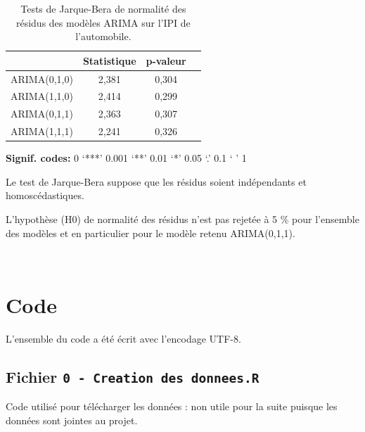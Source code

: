 \documentclass[french]{article}
\begin{document}
\begin{table}[!h]

\caption{\label{tab:tabjb}Tests de Jarque-Bera de normalité des résidus des modèles ARIMA sur l'IPI de l'automobile.}
\centering
\begin{threeparttable}
\begin{tabular}[t]{lccc}
\toprule
  & Statistique & p-valeur & \\
\midrule
ARIMA(0,1,0) & 2,381 & 0,304 & \\
ARIMA(1,1,0) & 2,414 & 0,299 & \\
ARIMA(0,1,1) & 2,363 & 0,307 & \\
ARIMA(1,1,1) & 2,241 & 0,326 & \\
\bottomrule
\end{tabular}
\begin{tablenotes}
\item \hspace{-0.4cm}\textbf{Signif. codes: }0 `***' 0.001 `**' 0.01 `*' 0.05 `.' 0.1 ` ' 1
\item Le test de Jarque-Bera suppose que les résidus soient indépendants et homoscédastiques.
\item L’hypothèse (H0) de normalité des résidus n’est pas rejetée à 5 \% pour l’ensemble des modèles et en particulier pour le modèle retenu ARIMA(0,1,1).
\end{tablenotes}
\end{threeparttable}
\end{table}

\newpage

~
\newpage

\hypertarget{code}{%
\section{\texorpdfstring{Code \faRProject{}}{Code }}\label{code}}

L'ensemble du code a été écrit avec l'encodage UTF-8.

\hypertarget{fichier-0---creation-des-donnees.r}{%
\subsection{\texorpdfstring{Fichier \texttt{0\ -\ Creation\ des\ donnees.R}}{Fichier 0 - Creation des donnees.R}}\label{fichier-0---creation-des-donnees.r}}

Code utilisé pour télécharger les données : non utile pour la suite puisque les données sont jointes au projet.
\end{document}

